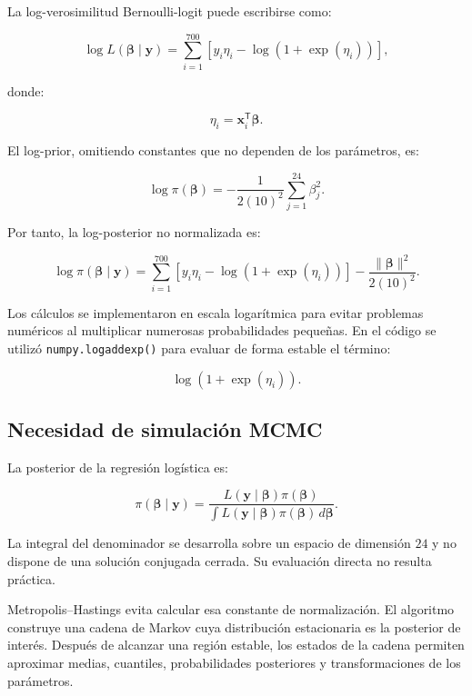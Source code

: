 La log-verosimilitud Bernoulli-logit puede escribirse como:

\[
\log L
\left(
    \boldsymbol{\beta}
\mid
\mathbf{y}
\right)
=
\sum_{i=1}^{700}
\left[
    y_i\eta_i
    -
    \log
    \left(
        1+\exp(\eta_i)
    \right)
\right],
\]

donde:

\[
\eta_i
=
\mathbf{x}_i^{\mathsf{T}}\boldsymbol{\beta}.
\]

El log-prior, omitiendo constantes que no dependen de los parámetros, es:

\[
\log \pi(\boldsymbol{\beta})
=
-
\frac{1}{2(10)^2}
\sum_{j=1}^{24}
\beta_j^2.
\]

Por tanto, la log-posterior no normalizada es:

\[
\log
\pi
\left(
    \boldsymbol{\beta}
    \mid
    \mathbf{y}
\right)
=
\sum_{i=1}^{700}
\left[
    y_i\eta_i
    -
    \log
    \left(
        1+\exp(\eta_i)
    \right)
\right]
-
\frac{
    \lVert\boldsymbol{\beta}\rVert^2
}{
    2(10)^2
}.
\]

Los cálculos se implementaron en escala logarítmica para evitar
problemas numéricos al multiplicar numerosas probabilidades pequeñas. En
el código se utilizó \texttt{numpy.logaddexp()} para evaluar de forma
estable el término:

\[
\log\left(1+\exp(\eta_i)\right).
\]

\subsection{Necesidad de simulación MCMC}

La posterior de la regresión logística es:

\[
\pi
\left(
    \boldsymbol{\beta}
    \mid
    \mathbf{y}
\right)
=
\frac{
    L
    \left(
        \mathbf{y}
        \mid
        \boldsymbol{\beta}
    \right)
    \pi(\boldsymbol{\beta})
}{
    \int
    L
    \left(
        \mathbf{y}
        \mid
        \boldsymbol{\beta}
    \right)
    \pi(\boldsymbol{\beta})
    \,d\boldsymbol{\beta}
}.
\]

La integral del denominador se desarrolla sobre un espacio de dimensión
\(24\) y no dispone de una solución conjugada cerrada. Su evaluación
directa no resulta práctica.

Metropolis--Hastings evita calcular esa constante de normalización. El
algoritmo construye una cadena de Markov cuya distribución estacionaria
es la posterior de interés. Después de alcanzar una región estable, los
estados de la cadena permiten aproximar medias, cuantiles, probabilidades
posteriores y transformaciones de los parámetros.


